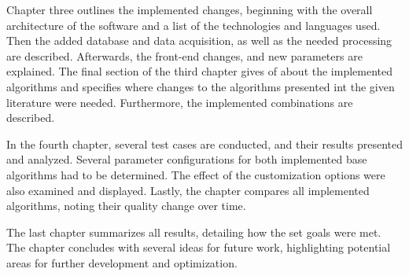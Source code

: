 Chapter three outlines the implemented changes, beginning with the overall architecture of the software and a list of the technologies and languages used.
Then the added database and data acquisition, as well as the needed processing are described.
Afterwards, the front-end changes, and new parameters are explained.
The final section of the third chapter gives of about the implemented algorithms and specifies where changes to the algorithms presented int the given literature were needed.
Furthermore, the implemented combinations are described.

In the fourth chapter, several test cases are conducted, and their results presented and analyzed.
Several parameter configurations for both implemented base algorithms had to be determined.
The effect of the customization options were also examined and displayed. 
Lastly, the chapter compares all implemented algorithms, noting their quality change over time.

The last chapter summarizes all results, detailing how the set goals were met.
The chapter concludes with several ideas for future work, highlighting potential areas for further development and optimization.








